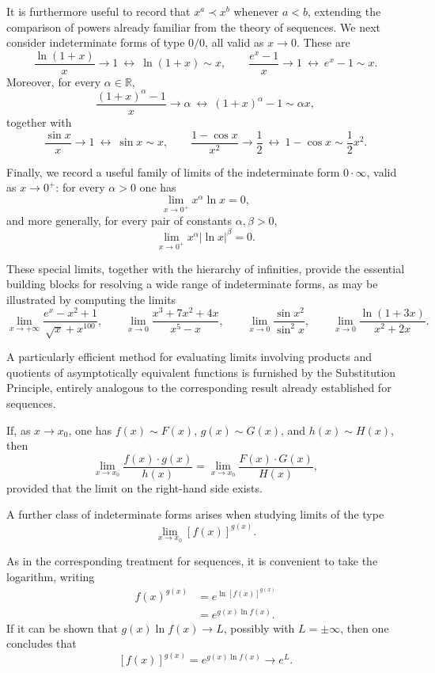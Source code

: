It is furthermore useful to record that $x^a \prec x^b$ whenever $a < b$, extending the comparison of powers already familiar from the theory of sequences. We next consider indeterminate forms of type $0/0$, all valid as $x \to 0$. These are
\[
\frac{\ln(1+x)}{x} \to 1 \ \longleftrightarrow\ \ln(1+x) \sim x, \qquad \frac{e^x - 1}{x} \to 1 \ \longleftrightarrow\ e^x - 1 \sim x.
\]
Moreover, for every $\alpha \in \mathbb{R}$,
\[
\frac{(1+x)^\alpha - 1}{x} \to \alpha \ \longleftrightarrow\ (1+x)^\alpha - 1 \sim \alpha x,
\]
together with
\[
\frac{\sin x}{x} \to 1 \ \longleftrightarrow\ \sin x \sim x, \qquad \frac{1 - \cos x}{x^2} \to \frac{1}{2} \ \longleftrightarrow\ 1 - \cos x \sim \frac{1}{2} x^2.
\]

Finally, we record a useful family of limits of the indeterminate form $0 \cdot \infty$, valid as $x \to 0^+$: for every $\alpha > 0$ one has \[
\lim_{x \to 0^+} x^\alpha \ln x = 0,
\] and more generally, for every pair of constants $\alpha, \beta > 0$,
\[
\lim_{x \to 0^+} x^\alpha |\ln x|^\beta = 0.
\]

These special limits, together with the hierarchy of infinities, provide the essential building blocks for resolving a wide range of indeterminate forms, as may be illustrated by computing the limits
\[
\lim_{x \to +\infty} \frac{e^x - x^2 + 1}{\sqrt{x} + x^{100}}, \qquad \lim_{x \to 0} \frac{x^3 + 7x^2 + 4x}{x^5 - x}, \qquad \lim_{x \to 0} \frac{\sin x^2}{\sin^2 x}, \qquad \lim_{x \to 0} \frac{\ln(1+3x)}{x^2 + 2x}.
\]


A particularly efficient method for evaluating limits involving products and quotients of asymptotically equivalent functions is furnished by the Substitution Principle, entirely analogous to the corresponding result already established for sequences.

\begin{theorem}
If, as $x \to x_0$, one has $f(x) \sim F(x)$, $g(x) \sim G(x)$, and $h(x) \sim H(x)$, then
\[
\lim_{x \to x_0} \frac{f(x) \cdot g(x)}{h(x)} = \lim_{x \to x_0} \frac{F(x) \cdot G(x)}{H(x)},
\]
provided that the limit on the right-hand side exists.
\end{theorem}

A further class of indeterminate forms arises when studying limits of the type
\[
\lim_{x \to x_0} [f(x)]^{g(x)}.
\]

As in the corresponding treatment for sequences, it is convenient to take the logarithm, writing
\[
\begin{aligned}
f(x)^{g(x)} &= e^{\ln [f(x)]^{g(x)}} \\
&= e^{g(x) \ln f(x)}.
\end{aligned}
\]
If it can be shown that $g(x) \ln f(x) \to L$, possibly with $L = \pm \infty$, then one concludes that
\[
[f(x)]^{g(x)} = e^{g(x) \ln f(x)} \to e^L.
\]

